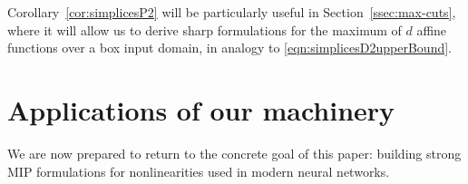\documentclass[smallextended]{svjour3}
\newcommand{\gr}{\operatorname{gr}}
\newcommand{\Max}{\texttt{Max}}
\newcommand{\ubar}[1]{\underline{#1}}
\renewcommand{\bar}[1]{\overline{#1}}
\begin{document}
Corollary~\ref{cor:simplicesP2} will be particularly useful in Section~\ref{ssec:max-cuts}, where it will allow us to derive sharp formulations for the maximum of $d$ affine functions over a box input domain, in analogy to \eqref{eqn:simplicesD2upperBound}.


\section{Applications of our machinery} \label{sec:applications}

We are now prepared to return to the concrete goal of this paper: building strong MIP formulations for nonlinearities used in modern neural networks.





\end{document}
